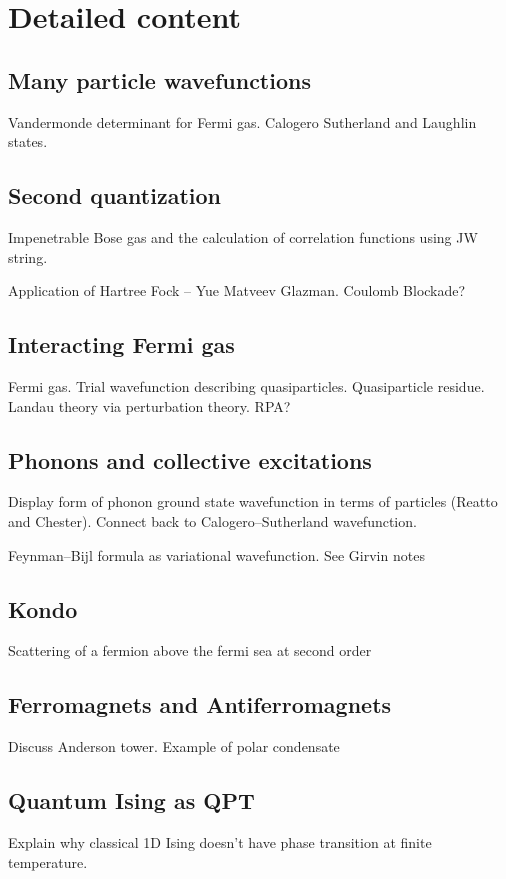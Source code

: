 \section{Detailed content}

\subsection{Many particle wavefunctions}

Vandermonde determinant for Fermi gas. Calogero Sutherland and Laughlin states.

\subsection{Second quantization}

Impenetrable Bose gas and the calculation of correlation functions using JW string.

Application of Hartree Fock -- Yue Matveev Glazman. Coulomb Blockade?

\subsection{Interacting Fermi gas}

Fermi gas. Trial wavefunction describing quasiparticles. Quasiparticle residue. Landau theory via perturbation theory. RPA?

\subsection{Phonons and collective excitations}

Display form of phonon ground state wavefunction in terms of particles (Reatto and Chester). Connect back to Calogero--Sutherland wavefunction. 

Feynman--Bijl formula as variational wavefunction. See Girvin notes

\subsection{Kondo}

Scattering of a fermion above the fermi sea at second order

\subsection{Ferromagnets and Antiferromagnets}

Discuss Anderson tower. Example of polar condensate

\subsection{Quantum Ising as QPT}

Explain why classical 1D Ising doesn't have phase transition at finite temperature.